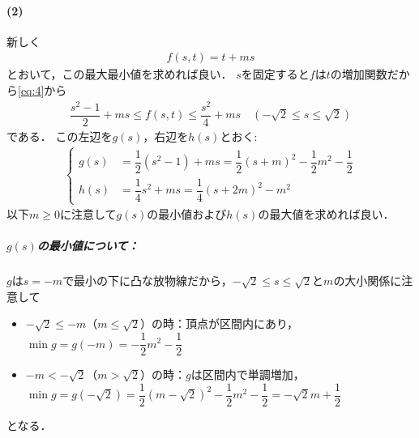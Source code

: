 \documentclass[../../main.tex]{subfiles}
\begin{document}
\paragraph{(2)}

新しく
\begin{align}
  f(s,t)=t+ms
\end{align}
とおいて，この最大最小値を求めれば良い．
$s$を固定すると$f$は$t$の増加関数だから\cref{eq:4}から
\begin{align}
  \dfrac{s^2-1}{2}+ms\le f(s,t)\le\dfrac{s^2}{4}+ms \quad (-\sqrt{2} \le s \le \sqrt{2})
\end{align}
である．
この左辺を$g(s)$，右辺を$h(s)$とおく:
\begin{align}
  \begin{cases}
    g(s)&=\dfrac{1}{2}(s^2-1)+ms=\dfrac{1}{2}(s+m)^2-\dfrac{1}{2}m^2-\dfrac{1}{2} \\
    h(s)&=\dfrac{1}{4}s^2+ms=\dfrac{1}{4}(s+2m)^2-m^2
  \end{cases}
\end{align}
以下$m \ge 0$に注意して$g(s)$の最小値および$h(s)$の最大値を求めれば良い．

\subparagraph{$g(s)$の最小値について：}

$g$は$s=-m$で最小の下に凸な放物線だから，$-\sqrt{2} \le s \le \sqrt{2}$と$m$の大小関係に注意して
\begin{itemize}
  \item $-\sqrt{2}\le-m$（$m\le\sqrt{2}$）の時：頂点が区間内にあり，$\min g=g(-m)=-\dfrac{1}{2}m^2-\dfrac{1}{2}$
  \item $-m<-\sqrt{2}$（$m>\sqrt{2}$）の時：$g$は区間内で単調増加，$\min g=g(-\sqrt{2})=\dfrac{1}{2}(m-\sqrt{2})^2-\dfrac{1}{2}m^2-\dfrac{1}{2}=-\sqrt{2}m+\dfrac{1}{2}$
\end{itemize}
となる．
\end{document}
